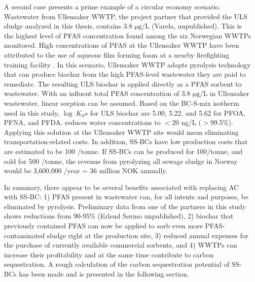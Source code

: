 A second case presents a prime example of a circular economy scenario. Wastewater from Ullensaker WWTP, the project partner that provided the ULS sludge analyzed in this thesis, contains 3.8 $\mathrm{\mu g/L}$ (Varela, unpublished). This is the highest level of PFAS concentration found among the six Norwegian WWTPs monitored. High concentrations of PFAS at the Ullensaker WWTP have been attributed to the use of aqueous film forming foam at a nearby firefighting training facility \citep{Hale2017fire}. In this scenario, Ullensaker WWTP adapts pyrolysis technology that can produce biochar from the high PFAS-level wastewater they are paid to remediate. The resulting ULS biochar is applied directly as a PFAS sorbent to wastewater. With an influent total PFAS concentration of 3.8 $\mathrm{\mu g/L}$ in Ullensaker wastewater, linear sorption can be assumed. Based on the BC-S-mix isotherm used in this study, $\log~K_ds$ for ULS biochar are 5.00, 5.22, and 5.62 for PFOA, PFNA, and PFDA. reduces water concentrations to $<$20 ng/L ($>$99.5\%). Applying this solution at the Ullensaker WWTP site would mean eliminating transportation-related costs. In addition, SS-BCs have low production costs that are estimated to be 100 \texteuro/tonne. If SS-BCs can be produced for 100\texteuro/tonne, and sold for 500 \texteuro/tonne, the revenue from pyrolyzing all sewage sludge in Norway would be 3,600,000 \texteuro/year = 36 million NOK annually. 

In summary, there appear to be several benefits associated with replacing AC with SS-BC: 1) PFAS present in wastewater can, for all intents and purposes, be eliminated by pyrolysis. Preliminary data from one of the partners in this study shows reductions from 90-95\% (Erlend S{\o}rmo unpublished), 2) biochar that previously contained PFAS can now be applied to sorb even more PFAS-contaminated sludge right at the production site, 3) reduced annual expenses for the purchase of currently available commercial sorbents, and 4) WWTPs can increase their profitability and at the same time contribute to carbon sequestration. A rough calculation of the carbon sequestration potential of SS-BCs has been made and is presented in the following section. 

